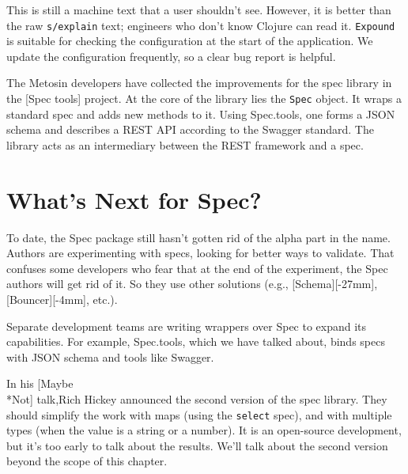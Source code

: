 
This is still a machine text that a user shouldn't see. However, it is better than the raw \verb|s/explain| text; engineers who don't know Clojure can read it. \verb|Expound| is suitable for checking the configuration at the start of the application. We update the configuration frequently, so a clear bug report is helpful.


The Metosin developers have collected the improvements for the spec library in the [Spec tools] project. At the core of the library lies the \verb|Spec| object. It wraps a standard spec and adds new methods to it. Using Spec.tools, one forms a JSON schema and describes a REST API according to the Swagger standard. The library acts as an intermediary between the REST framework and a spec.

\section{What's Next for Spec?}


To date, the Spec package still hasn't gotten rid of the alpha part in the name. Authors are experimenting with specs, looking for better ways to validate. That confuses some developers who fear that at the end of the experiment, the Spec authors will get rid of it. So they use other solutions (e.g., [Schema][-27mm],
[Bouncer][-4mm], etc.).

Separate development teams are writing wrappers over Spec to expand its capabilities. For example, Spec.tools, which we have talked about, binds specs with JSON schema and tools like Swagger.


In his [Maybe\\*Not] talk,Rich Hickey announced the second version of the spec library. They should simplify the work with maps (using the \verb|select| spec), and with multiple types (when the value is a string or a number). It is an open-source development, but it's too early to talk about the results. We'll talk about the second version beyond the scope of this chapter.

